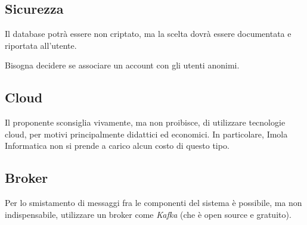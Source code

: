 \documentclass{article}
\begin{document}
\subsection{Sicurezza}%
\label{sub:sicurezza}
Il database potrà essere non criptato, ma la scelta dovrà essere documentata e riportata all'utente.\par
Bisogna decidere se associare un account con gli utenti anonimi.
\subsection{Cloud}%
\label{sub:cloud}
Il proponente sconsiglia vivamente, ma non proibisce, di utilizzare tecnologie cloud, per motivi principalmente didattici ed economici. In particolare, Imola Informatica non si prende a carico alcun costo di questo tipo.
\subsection{Broker}%
\label{sub:broker}
Per lo smistamento di messaggi fra le componenti del sistema è possibile, ma non indispensabile, utilizzare un broker come \textit{Kafka} (che è open source e gratuito).
\end{document}
